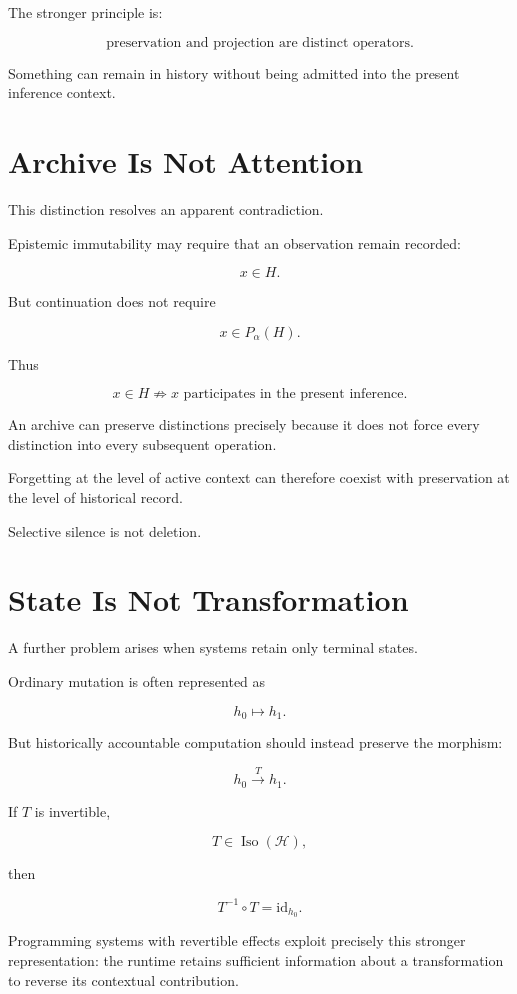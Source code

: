 \documentclass[11pt]{article}
\newcommand{\Iso}{\operatorname{Iso}}
\begin{document}
The stronger principle is:

\[ \boxed{ \text{preservation and projection are distinct operators}. }\]

Something can remain in history without being admitted into the present inference context.

\section{Archive Is Not Attention}

This distinction resolves an apparent contradiction.

Epistemic immutability may require that an observation remain recorded:

\[ x\in H.\]

But continuation does not require

\[ x\in P_\alpha(H).\]

Thus

\[ \boxed{ x\in H \not\Rightarrow x\text{ participates in the present inference}. }\]

An archive can preserve distinctions precisely because it does not force every distinction into every subsequent operation.

Forgetting at the level of active context can therefore coexist with preservation at the level of historical record.

Selective silence is not deletion.

\section{State Is Not Transformation}

A further problem arises when systems retain only terminal states.

Ordinary mutation is often represented as

\[ h_0\mapsto h_1.\]

But historically accountable computation should instead preserve the morphism:

\[ h_0\xrightarrow{T}h_1.\]

If $T$ is invertible,

\[ T\in\Iso(\mathcal H),\]

then

\[ T^{-1}\circ T=\mathrm{id}_{h_0}.\]

Programming systems with revertible effects exploit precisely this stronger representation: the runtime retains sufficient information about a transformation to reverse its contextual contribution.
\end{document}
